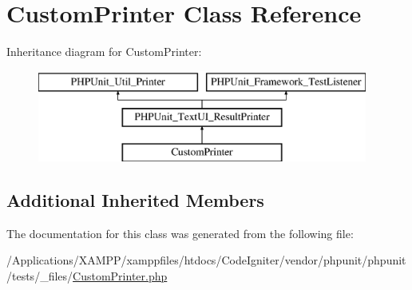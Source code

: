\hypertarget{class_custom_printer}{}\section{Custom\+Printer Class Reference}
\label{class_custom_printer}
Inheritance diagram for Custom\+Printer\+:\begin{figure}[H]
\begin{center}
\leavevmode
\includegraphics[height=3.000000cm]{class_custom_printer}
\end{center}
\end{figure}
\subsection*{Additional Inherited Members}


The documentation for this class was generated from the following file\+:\begin{DoxyCompactItemize}
\item 
/\+Applications/\+X\+A\+M\+P\+P/xamppfiles/htdocs/\+Code\+Igniter/vendor/phpunit/phpunit/tests/\+\_\+files/\mbox{\hyperlink{_custom_printer_8php}{Custom\+Printer.\+php}}\end{DoxyCompactItemize}
